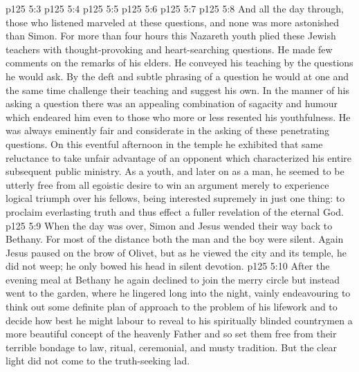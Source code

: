 \vs p125 5:3 \bibnobreakspace {}
\vs p125 5:4 \bibnobreakspace {}
\vs p125 5:5 \bibnobreakspace {}
\vs p125 5:6 \bibnobreakspace {}
\vs p125 5:7 \bibnobreakspace {}
\vs p125 5:8 \pc And all the day through, those who listened marveled at these questions, and none was more astonished than Simon. For more than four hours this Nazareth youth plied these Jewish teachers with thought\hyp{}provoking and heart\hyp{}searching questions. He made few comments on the remarks of his elders. He conveyed his teaching by the questions he would ask. By the deft and subtle phrasing of a question he would at one and the same time challenge their teaching and suggest his own. In the manner of his asking a question there was an appealing combination of sagacity and humour which endeared him even to those who more or less resented his youthfulness. He was always eminently fair and considerate in the asking of these penetrating questions. On this eventful afternoon in the temple he exhibited that same reluctance to take unfair advantage of an opponent which characterized his entire subsequent public ministry. As a youth, and later on as a man, he seemed to be utterly free from all egoistic desire to win an argument merely to experience logical triumph over his fellows, being interested supremely in just one thing: to proclaim everlasting truth and thus effect a fuller revelation of the eternal God.
\vs p125 5:9 \pc When the day was over, Simon and Jesus wended their way back to Bethany. For most of the distance both the man and the boy were silent. Again Jesus paused on the brow of Olivet, but as he viewed the city and its temple, he did not weep; he only bowed his head in silent devotion.
\vs p125 5:10 After the evening meal at Bethany he again declined to join the merry circle but instead went to the garden, where he lingered long into the night, vainly endeavouring to think out some definite plan of approach to the problem of his lifework and to decide how best he might labour to reveal to his spiritually blinded countrymen a more beautiful concept of the heavenly Father and so set them free from their terrible bondage to law, ritual, ceremonial, and musty tradition. But the clear light did not come to the truth\hyp{}seeking lad.
